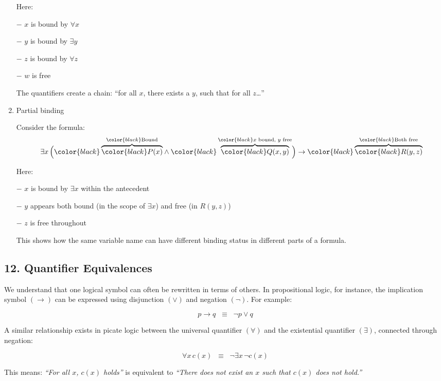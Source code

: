 \begin{enumerate}
  Here:

  − \(x\) is bound by \(\forall x\)

  − \(y\) is bound by \(\exists y\)

  − \(z\) is bound by \(\forall z\)

  − \(w\) is free

  The quantifiers create a chain: ``for all \(x\), there exists a \(y\),
  such that for all \(z\)\ldots''
\item
  Partial binding

  Consider the formula: \[
   \exists x \,
   \Big(
   {\color{black}\overbrace{\color{black}P(x)}^{\color{black}\text{Bound}}} \wedge 
   {\color{black}\overbrace{\color{black}Q(x, y)}^{\color{black}x \text{ bound, } y \text{ free}}}
   \Big) \rightarrow
   {\color{black}\overbrace{\color{black}R(y, z)}^{\color{black}\text{Both free}}}
   \]

  Here:

  − \(x\) is bound by \(\exists x\) within the antecedent

  − \(y\) appears both bound (in the scope of \(\exists x\)) and free
  (in \(R(y,z)\))

  − \(z\) is free throughout

  This shows how the same variable name can have different binding
  status in different parts of a formula.
\end{enumerate}

\subsection{12. Quantifier Equivalences}\label{quantifier-equivalences}

We understand that one logical symbol can often be rewritten in terms of
others. In propositional logic, for instance, the implication symbol
\((\rightarrow)\) can be expressed using disjunction \((\lor)\) and
negation \((\lnot)\). For example:

\[
p \rightarrow q \;\;\equiv\;\; \lnot p \lor q
\]

A similar relationship exists in picate logic between the universal
quantifier \((\forall)\) and the existential quantifier \((\exists)\),
connected through negation:

\[
\forall x \, c(x) \;\;\equiv\;\; \lnot \exists x \, \lnot c(x)
\]

This means: \emph{``For all \(x\), \(c(x)\) holds''} is equivalent to
\emph{``There does not exist an \(x\) such that \(c(x)\) does not
hold.''}


